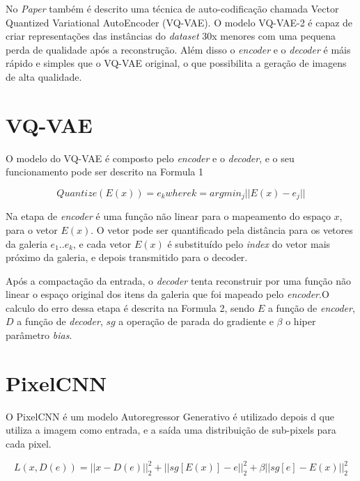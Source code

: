 \documentclass[12pt]{article}
\begin{document}
No \textit{Paper} também é descrito uma técnica de auto-codificação chamada Vector Quantized Variational AutoEncoder (VQ-VAE). O modelo VQ-VAE-2 é capaz de criar representações das instâncias do \textit{dataset} 30x menores com uma pequena perda de qualidade após a reconstrução. Além disso o \textit{encoder} e o \textit{decoder} é máis rápido e simples que o VQ-VAE original, o que possibilita a geração de imagens de alta qualidade.


\section{VQ-VAE}

O modelo do VQ-VAE é composto pelo \textit{encoder} e o \textit{decoder}, e o seu funcionamento pode ser descrito na Formula 1 

\begin{equation}
     Quantize(E(x)) = e_{k} where k = arg min_{j} || E(x) - e_{j}||
     \label{eq:saida-neuronio}
\end{equation}

Na etapa de \textit{encoder} é uma função não linear para o mapeamento do espaço $x$, para o vetor $E(x)$. O vetor pode ser quantificado pela distância para os vetores da galeria $e_{1}..e_{k}$, e cada vetor $E(x)$ é substituído pelo \textit{index} do vetor mais próximo da galeria, e depois transmitido para o decoder. 

Após a compactação da entrada, o \textit{decoder} tenta reconstruir por uma função não linear o espaço original dos itens da galeria que foi mapeado pelo \textit{encoder}.O calculo do erro dessa etapa é descrita na Formula 2, sendo $E$ a função de \textit{encoder}, $D$ a função de \textit{decoder}, $sg$ a operação de parada do gradiente e $\beta$ o hiper parâmetro 
\textit{bias}.

\section{PixelCNN}

O PixelCNN é um modelo Autoregressor Generativo é utilizado depois d  que utiliza a imagem como entrada, e a saída uma distribuição de sub-pixels para cada pixel.

\begin{equation}
     L(x,D(e)) = ||x - D(e)||_{2}^{2} + ||sg[E(x)] - e||_{2}^{2} + \beta||sg[e] - E(x)||_{2}^{2} 
     \label{eq:saida-neuronio}
\end{equation}
\end{document}
